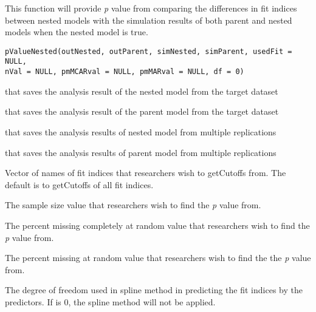\documentclass[a4paper]{book}
\begin{document}
%
\begin{Description}\relax
This function will provide \emph{p} value from comparing the differences in fit indices between nested models with the simulation results of both parent and nested models when the nested model is true. 
\end{Description}
%
\begin{Usage}
\begin{verbatim}
pValueNested(outNested, outParent, simNested, simParent, usedFit = NULL, 
nVal = NULL, pmMCARval = NULL, pmMARval = NULL, df = 0)
\end{verbatim}
\end{Usage}
%
\begin{Arguments}
\begin{ldescription}
\item[\code{outNested}] 
 that saves the analysis result of the nested model from the target dataset

\item[\code{outParent}] 
 that saves the analysis result of the parent model from the target dataset

\item[\code{simNested}] 
 that saves the analysis results of nested model from multiple replications

\item[\code{simParent}] 
 that saves the analysis results of parent model from multiple replications

\item[\code{usedFit}] 
Vector of names of fit indices that researchers wish to getCutoffs from. The default is to getCutoffs of all fit indices.

\item[\code{nVal}] 
The sample size value that researchers wish to find the \emph{p} value from.

\item[\code{pmMCARval}] 
The percent missing completely at random value that researchers wish to find the \emph{p} value from.

\item[\code{pmMARval}] 
The percent missing at random value that researchers wish to find the the \emph{p} value from.

\item[\code{df}] 
The degree of freedom used in spline method in predicting the fit indices by the predictors. If  is 0, the spline method will not be applied.

\end{ldescription}
\end{Arguments}
\end{document}

